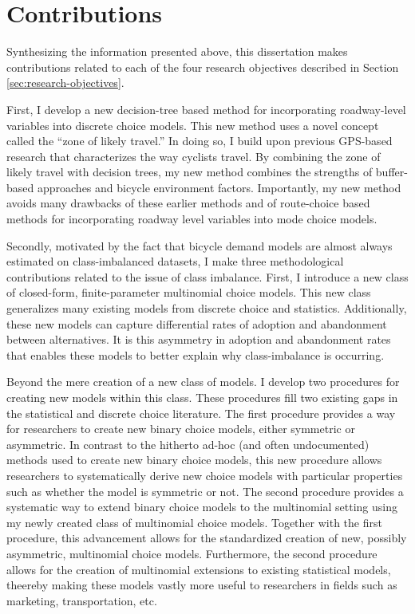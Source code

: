 \documentclass{article}
\begin{document}
\section{Contributions}
\label{sec:intro-contributions}
Synthesizing the information presented above, this dissertation makes contributions related to each of the four research objectives described in Section \ref{sec:research-objectives}.

First, I develop a new decision-tree based method for incorporating roadway-level variables into discrete choice models. This new method uses a novel concept called the ``zone of likely travel.'' In doing so, I build upon previous GPS-based research that characterizes the way cyclists travel. By combining the zone of likely travel with decision trees, my new method combines the strengths of buffer-based approaches and bicycle environment factors. Importantly, my new method avoids many drawbacks of these earlier methods and of route-choice based methods for incorporating roadway level variables into mode choice models.

Secondly, motivated by the fact that bicycle demand models are almost always estimated on class-imbalanced datasets, I make three methodological contributions related to the issue of class imbalance. First, I introduce a new class of closed-form, finite-parameter multinomial choice models. This new class generalizes many existing models from discrete choice and statistics. Additionally, these new models can capture differential rates of adoption and abandonment between alternatives. It is this asymmetry in adoption and abandonment rates that enables these models to better explain why class-imbalance is occurring.

Beyond the mere creation of a new class of models. I develop two procedures for creating new models within this class. These procedures fill two existing gaps in the statistical and discrete choice literature. The first procedure provides a way for researchers to create new binary choice models, either symmetric or asymmetric. In contrast to the hitherto ad-hoc (and often undocumented) methods used to create new binary choice models, this new procedure allows researchers to systematically derive new choice models with particular properties such as whether the model is symmetric or not. The second procedure provides a systematic way to extend binary choice models to the multinomial setting using my newly created class of multinomial choice models. Together with the first procedure, this advancement allows for the standardized creation of new, possibly asymmetric, multinomial choice models. Furthermore, the second procedure allows for the creation of multinomial extensions to existing statistical models, theereby making these models vastly more useful to researchers in fields such as marketing, transportation, etc.
\end{document}
